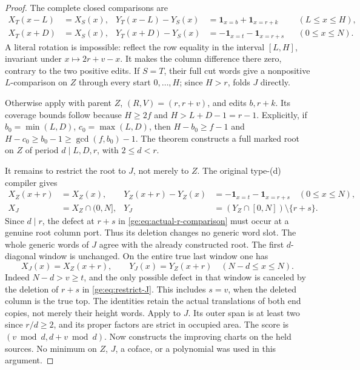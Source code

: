 \documentclass[11pt,a4paper]{amsart}
\numberwithin{equation}{section}
\theoremstyle{plain}
\theoremstyle{definition}
\newcommand{\one}{\mathbf1}
\begin{document}
\begin{proof}
The complete closed comparisons are
\begin{align}
 X_T(x-L)&=X_S(x),&
 Y_T(x-L)-Y_S(x)&=\one_{x=b}+\one_{x=r+k}
 &&(L\le x\le H),\label{ge:eq:amplified-positive}\\
 X_T(x+D)&=X_S(x),&
 Y_T(x+D)-Y_S(x)&=-\one_{x=t}-\one_{x=r+s}
 &&(0\le x\le N).\label{ge:eq:amplified-negative}
\end{align}
A literal rotation is impossible: reflect the row equality in the
interval \([L,H]\), invariant under \(x\mapsto2r+v-x\).  It makes
the column difference there zero, contrary to the two positive edits.
If \(S=T\), their full cut words give a nonpositive \(L\)-comparison
on \(Z\) through every start \(0,\ldots,H\); since \(H>r\),
 folds \(J\) directly.

Otherwise apply  with parent \(Z\),
\((R,V)=(r,r+v)\), and edits \(b,r+k\).  Its coverage bounds follow
because \(H\ge2f\) and \(H>L+D-1=r-1\).  Explicitly, if
\(b_0=\min(L,D)\), \(c_0=\max(L,D)\), then
\(H-b_0\ge f-1\) and
\(H-c_0\ge b_0-1\ge\gcd(f,b_0)-1\).
The theorem constructs a full marked root on \(Z\) of period
\(d\mid L,D,r\), with \(2\le d<r\).

It remains to restrict the root to \(J\), not merely to \(Z\).
The original type-(d) compiler gives
\begin{align}
 X_Z(x+r)&=X_Z(x),&
 Y_Z(x+r)-Y_Z(x)&=-\one_{x=t}-\one_{x=r+s}\quad(0\le x\le N),
 \label{ge:eq:actual-r-comparison}\\
 X_J&=X_Z\cap(0,N],&Y_J&=(Y_Z\cap[0,N])\setminus\{r+s\}.
 \label{ge:eq:restrict-J}
\end{align}
Since \(d\mid r\), the defect at \(r+s\) in
\eqref{ge:eq:actual-r-comparison} must occur at a genuine root column
port.  Thus its deletion changes no generic word slot.  The whole generic
words of \(J\) agree with the already constructed root.
The first \(d\)-diagonal window is unchanged.  On the entire true
last window one has
\begin{equation}\label{ge:eq:true-last-window}
 X_J(x)=X_Z(x+r),\qquad Y_J(x)=Y_Z(x+r)
                   \quad(N-d\le x\le N).
\end{equation}
Indeed \(N-d>v\ge t\), and the only possible defect in that
window is canceled by the deletion of \(r+s\) in
\eqref{ge:eq:restrict-J}.  This includes \(s=v\), when the deleted
column is the true top.  The identities retain the actual translations
of both end copies, not merely their height words.  Apply
\cite[Recovery from the generic words]{Shields2026Gluing} to \(J\).  Its outer span is at least two since
\(r/d\ge2\), and its proper factors are strict in occupied area.
The score is \((v\bmod d,d+v\bmod d)\).  Now
 constructs the improving charts on the held
sources.  No minimum on \(Z\), \(J\), a coface, or a polynomial was
used in this argument.
\end{proof}
\end{document}

